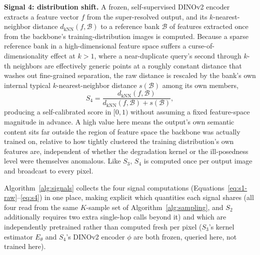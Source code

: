 \documentclass[review]{elsarticle}
\begin{document}
\textbf{Signal 4: distribution shift.} A frozen, self-supervised DINOv2 encoder~\citep{oquab2024dinov2} extracts a feature vector $f$ from the super-resolved output, and its $k$-nearest-neighbor distance $d_{\mathrm{kNN}}(f, \mathcal{B})$ to a reference bank $\mathcal{B}$ of features extracted once from the backbone's training-distribution images is computed. Because a sparse reference bank in a high-dimensional feature space suffers a curse-of-dimensionality effect at $k>1$, where a near-duplicate query's second through $k$-th neighbors are effectively generic points at a roughly constant distance that washes out fine-grained separation, the raw distance is rescaled by the bank's own internal typical $k$-nearest-neighbor distance $s(\mathcal{B})$ among its own members,
\begin{equation}
S_4 = \frac{d_{\mathrm{kNN}}(f, \mathcal{B})}{d_{\mathrm{kNN}}(f, \mathcal{B}) + s(\mathcal{B})},
\label{eq:s4}
\end{equation}
producing a self-calibrated score in $[0,1)$ without assuming a fixed feature-space magnitude in advance. A high value here means the output's own semantic content sits far outside the region of feature space the backbone was actually trained on, relative to how tightly clustered the training distribution's own features are, independent of whether the degradation kernel or the ill-posedness level were themselves anomalous. Like $S_3$, $S_4$ is computed once per output image and broadcast to every pixel.

Algorithm~\ref{alg:signals} collects the four signal computations (Equations~\ref{eq:s1-raw}--\ref{eq:s4}) in one place, making explicit which quantities each signal shares (all four read from the same $K$-sample set of Algorithm~\ref{alg:sampling}, and $S_2$ additionally requires two extra single-hop calls beyond it) and which are independently pretrained rather than computed fresh per pixel ($S_3$'s kernel estimator $E_\theta$ and $S_4$'s DINOv2 encoder $\phi$ are both frozen, queried here, not trained here).
\end{document}
